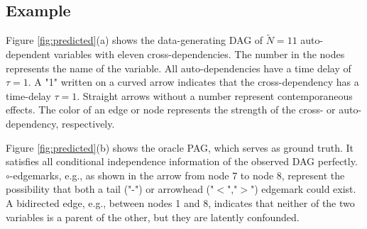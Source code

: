 \documentclass[conference]{IEEEtran}
\begin{document}
\subsection{Example}
Figure \ref{fig:predicted}(a) shows the data-generating DAG of $\tilde{N}=11$ auto-dependent variables with eleven cross-dependencies.
The number in the nodes represents the name of the variable.
All auto-dependencies have a time delay of $\tau=1$.
A "1" written on a curved arrow indicates that the cross-dependency has a time-delay $\tau=1$. Straight arrows without a number represent contemporaneous effects. 
The color of an edge or node represents the strength of the cross- or auto-dependency, respectively.

Figure \ref{fig:predicted}(b) shows the oracle PAG, which serves as ground truth. It satisfies all conditional independence information of the observed DAG perfectly.
$\circ$-edgemarks, e.g., as shown in the arrow from node 7 to node 8, represent the possibility that both a tail ("-") or arrowhead ("$<$","$>$") edgemark could exist.
A bidirected edge, e.g., between nodes 1 and 8, indicates that neither of the two variables is a parent of the other, but they are latently confounded.
\end{document}
